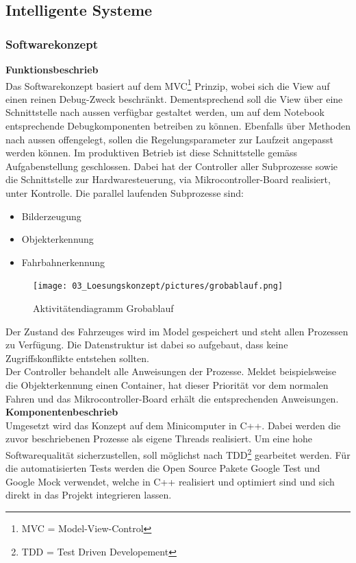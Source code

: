 \subsection{Intelligente Systeme}
\subsubsection{Softwarekonzept}
\textbf{Funktionsbeschrieb}\\[0.2cm]
Das Softwarekonzept basiert auf dem MVC\footnote{MVC = Model-View-Control} Prinzip, wobei sich die View auf einen reinen Debug-Zweck beschränkt. Dementsprechend soll die View über eine Schnittstelle nach aussen verfügbar gestaltet werden, um auf dem Notebook entsprechende Debugkomponenten betreiben zu können. Ebenfalls über Methoden nach aussen offengelegt, sollen die Regelungsparameter zur Laufzeit angepasst werden können. Im produktiven Betrieb ist diese Schnittstelle gemäss Aufgabenstellung geschlossen. Dabei hat der Controller aller Subprozesse sowie die Schnittstelle zur Hardwaresteuerung, via Mikrocontroller-Board realisiert, unter Kontrolle. Die parallel laufenden Subprozesse sind:
\begin{itemize}
\item Bilderzeugung
\item Objekterkennung
\item Fahrbahnerkennung
\end{itemize}
\begin{figure}[H]
	\centering
	\texttt{[image: 03\_Loesungskonzept/pictures/grobablauf.png]}
	\caption{Aktivitätendiagramm Grobablauf}
\end{figure}\flushleft
Der Zustand des Fahrzeuges wird im Model gespeichert und steht allen Prozessen zu Verfügung. Die Datenstruktur ist dabei so aufgebaut, dass keine Zugriffskonflikte entstehen sollten.\\
Der Controller behandelt alle Anweisungen der Prozesse. Meldet beispielsweise die Objekterkennung einen Container, hat dieser Priorität vor dem normalen Fahren und das Mikrocontroller-Board erhält die entsprechenden Anweisungen.\\[0.2cm]
\textbf{Komponentenbeschrieb}\\[0.2cm]
Umgesetzt wird das Konzept auf dem Minicomputer in C++. Dabei werden die zuvor beschriebenen Prozesse als eigene Threads realisiert. Um eine hohe Softwarequalität sicherzustellen, soll möglichst nach TDD\footnote{TDD = Test Driven Developement} gearbeitet werden. Für die automatisierten Tests werden die Open Source Pakete Google Test und Google Mock verwendet, welche in C++ realisiert und optimiert sind und sich direkt in das Projekt integrieren lassen.\\
